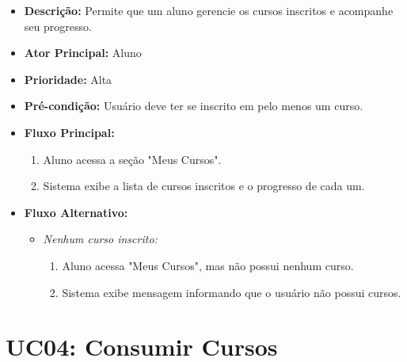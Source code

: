         \begin{itemize}
            \item \textbf{Descrição:} Permite que um aluno gerencie os cursos inscritos e acompanhe seu progresso.
            
            \item \textbf{Ator Principal:} Aluno
            
            \item \textbf{Prioridade:} Alta
            
            \item \textbf{Pré-condição:} Usuário deve ter se inscrito em pelo menos um curso.
            
            \item \textbf{Fluxo Principal:}
            \begin{enumerate}
                \item Aluno acessa a seção "Meus Cursos".
                \item Sistema exibe a lista de cursos inscritos e o progresso de cada um.
            \end{enumerate}

            \item \textbf{Fluxo Alternativo:}
            \begin{itemize}
                \item \textit{Nenhum curso inscrito:}
                \begin{enumerate}
                    \item Aluno acessa "Meus Cursos", mas não possui nenhum curso.
                    \item Sistema exibe mensagem informando que o usuário não possui cursos.
                \end{enumerate}
            \end{itemize}
        \end{itemize}

        \section*{UC04: Consumir Cursos}

